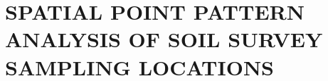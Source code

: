 \artigotrue
\chapter{SPATIAL POINT PATTERN ANALYSIS OF SOIL SURVEY SAMPLING LOCATIONS}
\label{chap:chap07}



\def\enkeys{Soil spatial modelling. Free survey. Point pattern analysis. Expert judgement. Motivation}
  

